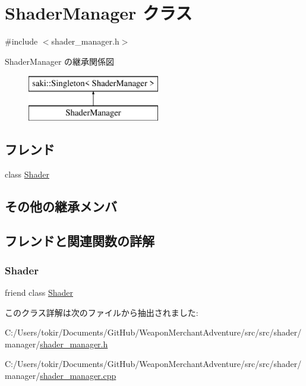 \hypertarget{class_shader_manager}{}\section{Shader\+Manager クラス}
\label{class_shader_manager}


{\ttfamily \#include $<$shader\+\_\+manager.\+h$>$}

Shader\+Manager の継承関係図\begin{figure}[H]
\begin{center}
\leavevmode
\includegraphics[height=2.000000cm]{class_shader_manager}
\end{center}
\end{figure}
\subsection*{フレンド}
\begin{DoxyCompactItemize}
\item 
class \mbox{\hyperlink{class_shader_manager_a03c2d524ace9ade9c3f55b43c99bcea1}{Shader}}
\end{DoxyCompactItemize}
\subsection*{その他の継承メンバ}


\subsection{フレンドと関連関数の詳解}
\mbox{\label{class_shader_manager_a03c2d524ace9ade9c3f55b43c99bcea1}} 
\subsubsection{\texorpdfstring{Shader}{Shader}}
{\footnotesize\ttfamily friend class \mbox{\hyperlink{class_shader}{Shader}}\hspace{0.3cm}{\ttfamily [friend]}}



このクラス詳解は次のファイルから抽出されました\+:\begin{DoxyCompactItemize}
\item 
C\+:/\+Users/tokir/\+Documents/\+Git\+Hub/\+Weapon\+Merchant\+Adventure/src/src/shader/manager/\mbox{\hyperlink{shader__manager_8h}{shader\+\_\+manager.\+h}}\item 
C\+:/\+Users/tokir/\+Documents/\+Git\+Hub/\+Weapon\+Merchant\+Adventure/src/src/shader/manager/\mbox{\hyperlink{shader__manager_8cpp}{shader\+\_\+manager.\+cpp}}\end{DoxyCompactItemize}
